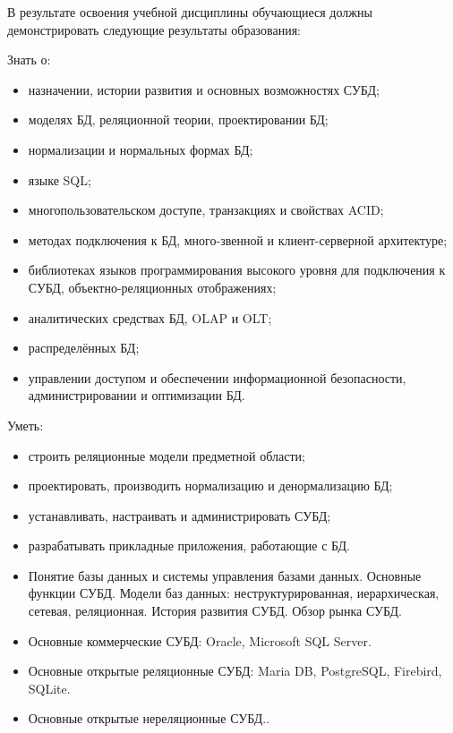 \documentclass[a4paper]{article}
\begin{document}
\begin{itemize}
\end{itemize}

В результате освоения учебной дисциплины обучающиеся должны демонстрировать следующие результаты образования:

Знать о:
\begin{itemize}
  \item назначении, истории развития и основных возможностях СУБД;
  \item моделях БД, реляционной теории, проектировании БД;
  \item нормализации и нормальных формах БД;
  \item языке SQL;
  \item многопользовательском доступе, транзакциях и свойствах ACID;
  \item методах подключения к БД, много-звенной и клиент-серверной архитектуре;
  \item библиотеках языков программирования высокого уровня для подключения к СУБД, объектно-реляционных отображениях;
  \item аналитических средствах БД, OLAP и OLT;
  \item распределённых БД;
  \item управлении доступом и обеспечении информационной безопасности, администрировании и оптимизации БД.
\end{itemize}

Уметь:
\begin{itemize}
  \item строить реляционные модели предметной области;
  \item проектировать, производить нормализацию и денормализацию БД;
  \item устанавливать, настраивать и администрировать СУБД;
  \item разрабатывать прикладные приложения, работающие с БД.
\end{itemize}

\CourseTheorySection


\begin{itemize}
  \item Понятие базы данных и системы управления базами данных. Основные функции СУБД. Модели баз данных: неструктурированная, иерархическая, сетевая, реляционная. История развития СУБД. Обзор рынка СУБД.
  \item Основные коммерческие СУБД: Oracle, Microsoft SQL Server.
  \item Основные открытые реляционные СУБД: Maria DB, PostgreSQL, Firebird, SQLite.
  \item Основные открытые нереляционные СУБД..
\end{itemize}
\end{document}

